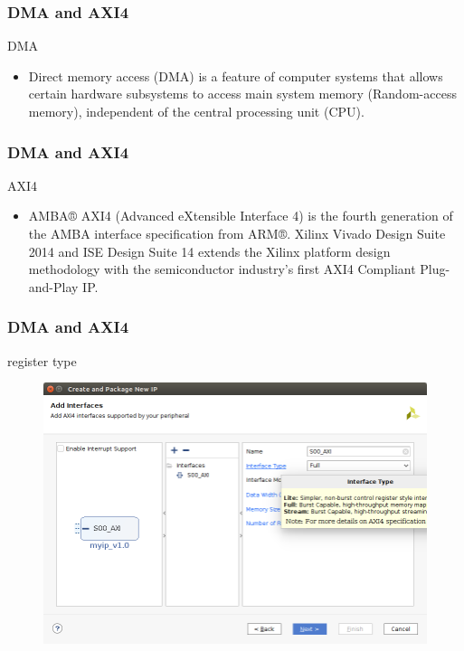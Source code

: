 \documentclass{beamer}
\begin{document}
\begin{frame}
\frametitle{DMA and AXI4}
\centering DMA
\centering \\
\begin{itemize}
\item Direct memory access (DMA) is a feature of computer systems that allows certain hardware subsystems to access main system memory (Random-access memory), independent of the central processing unit (CPU).
\end{itemize}
\end{frame}

\begin{frame}
\frametitle{DMA and AXI4}
\centering AXI4
\centering \\
\begin{itemize}
\item AMBA® AXI4 (Advanced eXtensible Interface 4) is the fourth generation of the AMBA interface specification from ARM®. Xilinx Vivado Design Suite 2014 and ISE Design Suite 14 extends the Xilinx platform design methodology with the semiconductor industry's first AXI4 Compliant Plug-and-Play IP.
\end{itemize}
\end{frame}

\begin{frame}[fragile]
\frametitle{DMA and AXI4}
\centering register type\\
\begin{figure}
\centering\includegraphics[scale=0.35]{register-type.png}
\end{figure}
\begin{verbatim}
\end{verbatim}
\end{frame}
\end{document}
